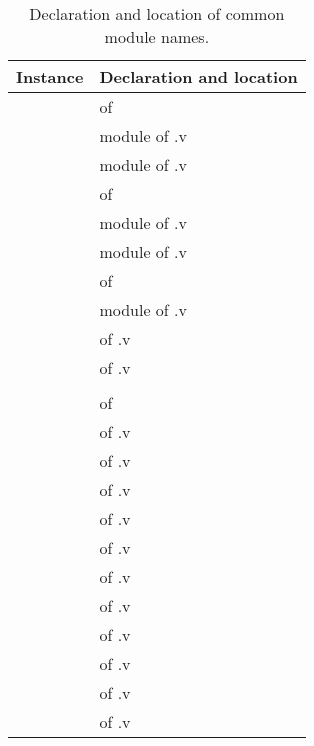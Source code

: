 \begin{table}
  \centering
  \begin{tabular}{| l | l |}
    \hline
    Instance & Declaration and location \\
    \hline \hline
    \COQARSet{} & \COQFSet{} of \COQAccessRight{} \\
    \COQRef{} & \COQReferenceType{} module of \COQReferences{}.v\\
    \COQRefS{} &  \COQRefSetType{} module of \COQRefSets{}.v\\
    \COQRefSet{} & \COQReference{} \COQFSet{} of \COQRefS{} \\
    \COQEdges{} &  \COQAccessEdgeType{} module of \COQAccessEdges{}.v \\
    \COQAccessGraph{} & \COQAccessGraphType{} module of \COQAccessGraphs{}.v\\
    \COQAG{} & \COQFSet{} of \COQAccessGraphType{} \\
    \COQSeq{} & \COQSeqAccType{} module of \COQSequentialAccess{}.v\\
    \COQCap{} & \COQCapabilityType{} of \COQCapabilities{}.v\\
    \COQCC{} & \COQCapabilityConv{} of \COQCapabilitiesUConv{}.v \\
    \COQCapS{} &  \COQCapSetType{} \\
    \COQCapSet{} & \COQCapability{} \COQFSet{} of \COQCapS{} \\
    \COQInd{} & \COQIndexType{} of \COQIndicies{}.v\\
    \COQObj{} & \COQObjectType{} of \COQObjects{}.v \\
    \COQOC{} & \COQObjectConv{} of \COQObjectsUConv{}.v \\
    \COQSys{} & \COQSystemStateType{} of \COQSystemState{}.v \\
    \COQSC{} & \COQSystemStateConv{} of \COQSystemStateUConv{}.v \\
    \COQSemDefns{} &  \COQSemanticsDefinitionsType{} of \COQSemanticsDefinitions{}.v \\
    \COQSem{} &  \COQSemanticsType{} of \COQSemantics{}.v \\
    \COQSemConv{} & \COQSemanticsConv{} of \COQSemanticsUConv{}.v \\
    \COQExe{} &  \COQExecutionType{} of \COQExecution{}.v\\
    \COQMut{} &  \COQMutationType{} of \COQMutation{}.v \\
    \COQSub{} &  \COQSubsystemType{} of \COQSubsystem{}.v \\
    \hline
  \end{tabular}
  \caption{Declaration and location of common module names.\label{table:coq:moduleConvention}}
\end{table}



